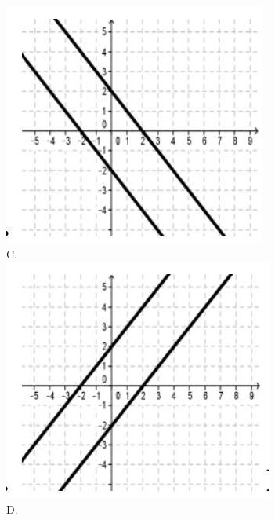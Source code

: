 \documentclass[10pt]{article}
\begin{document}
\includegraphics[max width=\textwidth, center]{2024_11_21_9a9f600c3b3af5013d80g-04(1)}\\
C.\\
\includegraphics[max width=\textwidth, center]{2024_11_21_9a9f600c3b3af5013d80g-04(4)}\\
D.\\
\end{document}

